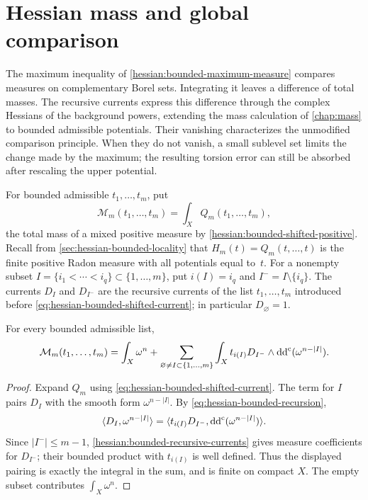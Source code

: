 \section{Hessian mass and global comparison}
\label{sec:hessian-mass-comparison}

The maximum inequality of \cref{hessian:bounded-maximum-measure}
compares measures on complementary Borel sets.
Integrating it leaves a difference of total masses. The recursive
currents express this difference through the complex Hessians of the
background powers, extending the mass calculation of
\cref{chap:mass} to bounded admissible potentials. Their vanishing
characterizes the unmodified comparison principle. When they do not
vanish, a small sublevel set limits the change made by the maximum;
the resulting torsion error can still be absorbed after rescaling
the upper potential.

For bounded admissible $t_1,\ldots,t_m$, put
\[
 \mathcal M_m(t_1,\ldots,t_m)=\int_XQ_m(t_1,\ldots,t_m),
\]
the total mass of a mixed positive measure by
\cref{hessian:bounded-shifted-positive}. Recall from
\cref{sec:hessian-bounded-locality} that $H_m(t)=Q_m(t,\ldots,t)$
is the finite positive Radon measure with all potentials equal
to~$t$. For a nonempty subset
$I=\{i_1<\cdots<i_q\}\subset\{1,\ldots,m\}$, put
$i(I)=i_q$ and $I^-=I\setminus\{i_q\}$. The currents $D_I$ and
$D_{I^-}$ are the recursive currents of the list $t_1,\ldots,t_m$
introduced before \eqref{eq:hessian-bounded-shifted-current};
in particular $D_\varnothing=1$.

\begin{lemma}\label{hessian:bounded-mass-expansion}
For every bounded admissible list,
\begin{equation}\label{eq:hessian-bounded-mass-expansion}
 \mathcal M_m(t_1,\ldots,t_m)
 =\int_X\omega^n+
 \sum_{\varnothing\ne I\subset\{1,\ldots,m\}}
 \int_X t_{i(I)}D_{I^-}\wedge\mathrm{dd}^{\mathrm{c}}(\omega^{n-|I|}).
\end{equation}
\end{lemma}
\begin{proof}
Expand $Q_m$ using \eqref{eq:hessian-bounded-shifted-current}.
The term for $I$ pairs $D_I$ with the smooth form
$\omega^{n-|I|}$. By \eqref{eq:hessian-bounded-recursion},
\[
 \langle D_I,\omega^{n-|I|}\rangle
 =\langle t_{i(I)}D_{I^-},\mathrm{dd}^{\mathrm{c}}(\omega^{n-|I|})\rangle.
\]
Since $|I^-|\leq m-1$, \cref{hessian:bounded-recursive-currents}
gives measure coefficients for $D_{I^-}$; their bounded product
with $t_{i(I)}$ is well defined. Thus the displayed pairing is
exactly the integral in the sum, and is finite on compact $X$.
The empty subset contributes $\int_X\omega^n$.
\end{proof}

